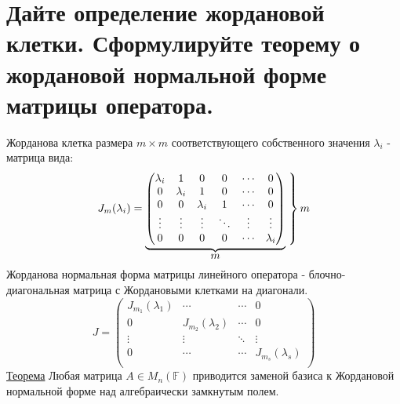 \documentclass{article}
\begin{document}
\section{Дайте определение жордановой клетки. Сформулируйте теорему о жордановой нормальной форме матрицы оператора.}
Жорданова клетка размера $m \times m$ соответствующего собственного значения $\lambda_i$ - матрица вида:
$$
J_m(\lambda_i) = \underbrace{
\begin{pmatrix}
\lambda_i & 1 & 0 & 0 & \cdots & 0\\
0 & \lambda_i & 1 & 0 & \cdots & 0\\
0 & 0 & \lambda_i & 1 & \cdots & 0\\
\vdots & \vdots & \vdots & \ddots & \vdots & \vdots\\
0 & 0 & 0 & 0 & \cdots & \lambda_i\\
\end{pmatrix}}_{\displaystyle m}
\left.\vphantom{\begin{pmatrix}
1\lambda_i & 1 & 0 & 0 & \cdots & 0\\
0 & \lambda_i & 1 & 0 & \cdots & 0\\
0 & 0 & \lambda_i & 1 & \cdots & 0\\
\vdots & \vdots & \vdots & \ddots & \vdots & \vdots\\
0 & 0 & 0 & 0 & \cdots & \lambda_i\\
\end{pmatrix}}\right\}m
$$
Жорданова нормальная форма матрицы линейного оператора - блочно-диагональная матрица
с Жордановыми клетками на диагонали.
$$
J = 
\begin{pmatrix}
    J_{m_1}(\lambda_1) & \cdots & \cdots & 0 \\
    0 & J_{m_2}(\lambda_2) & \cdots & 0 \\
    \vdots & \vdots & \ddots & \vdots \\
    0 & \cdots & \cdots & J_{m_s}(\lambda_s)\\
\end{pmatrix}
$$
\underline{Теорема} Любая матрица $A \in M_n(\mathbb{F})$ приводится заменой базиса к Жордановой нормальной форме 
над алгебраически замкнутым полем.
\end{document}
